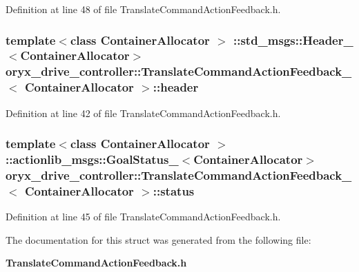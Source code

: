\-Definition at line 48 of file \-Translate\-Command\-Action\-Feedback.\-h.

\subsubsection[{header}]{\setlength{\rightskip}{0pt plus 5cm}template$<$class Container\-Allocator $>$ \-::std\-\_\-msgs\-::\-Header\-\_\-$<$\-Container\-Allocator$>$ {\bf oryx\-\_\-drive\-\_\-controller\-::\-Translate\-Command\-Action\-Feedback\-\_\-}$<$ \-Container\-Allocator $>$\-::{\bf header}}\label{structoryx__drive__controller_1_1TranslateCommandActionFeedback___acf2fbc07a78b8a1eee142b65ec009f68}


\-Definition at line 42 of file \-Translate\-Command\-Action\-Feedback.\-h.

\subsubsection[{status}]{\setlength{\rightskip}{0pt plus 5cm}template$<$class Container\-Allocator $>$ \-::actionlib\-\_\-msgs\-::\-Goal\-Status\-\_\-$<$\-Container\-Allocator$>$ {\bf oryx\-\_\-drive\-\_\-controller\-::\-Translate\-Command\-Action\-Feedback\-\_\-}$<$ \-Container\-Allocator $>$\-::{\bf status}}\label{structoryx__drive__controller_1_1TranslateCommandActionFeedback___a13531ddb0e0e9f38b5e439eeb220368b}


\-Definition at line 45 of file \-Translate\-Command\-Action\-Feedback.\-h.



\-The documentation for this struct was generated from the following file\-:\begin{DoxyCompactItemize}
\item 
{\bf \-Translate\-Command\-Action\-Feedback.\-h}\end{DoxyCompactItemize}
